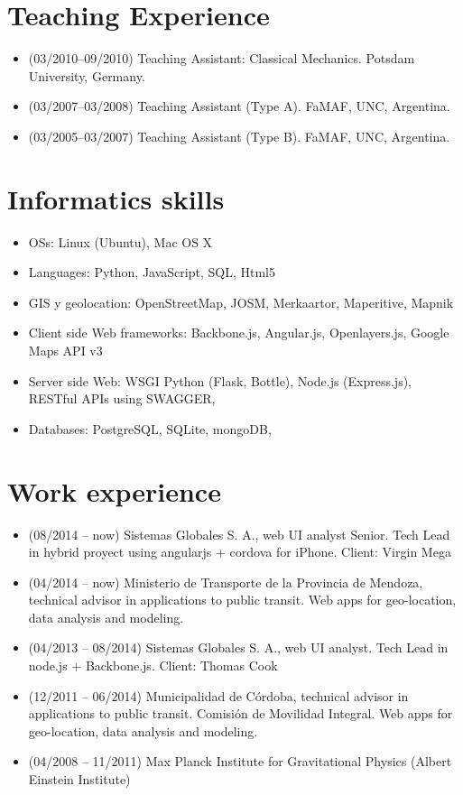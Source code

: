 \documentclass[a4paper]{article}
\begin{document}
\section{Teaching Experience}
\begin{itemize}
 \item(03/2010--09/2010) Teaching Assistant: Classical Mechanics. Potsdam
University, Germany.
 \item(03/2007--03/2008) Teaching Assistant (Type A). FaMAF, UNC, Argentina.
 \item(03/2005--03/2007) Teaching Assistant (Type B). FaMAF, UNC, Argentina.
\end{itemize}

\section{Informatics skills}
\begin{itemize}
 \item OSs: Linux (Ubuntu), Mac OS X
 \item Languages: Python, JavaScript, SQL, Html5
 \item GIS y geolocation: OpenStreetMap, JOSM, Merkaartor, Maperitive, Mapnik
 \item Client side Web frameworks: Backbone.js, Angular.js, Openlayers.js, Google Maps API 
v3
 \item Server side Web: WSGI Python (Flask, Bottle), Node.js (Express.js), 
RESTful APIs using SWAGGER,
 \item Databases: PostgreSQL, SQLite, mongoDB,
\end{itemize}

\section{Work experience}
\begin{itemize}
 \item (08/2014 -- now) Sistemas Globales S. A., web UI analyst Senior. 
Tech Lead in hybrid proyect using angularjs + cordova for iPhone. Client: Virgin Mega
 \item (04/2014 -- now) Ministerio de Transporte de la Provincia de Mendoza, 
 technical advisor in applications to public transit. Web apps for geo-location, data analysis and modeling.
 \item (04/2013 -- 08/2014) Sistemas Globales S. A., web UI analyst. 
Tech Lead in node.js + Backbone.js. Client: Thomas Cook
 \item (12/2011 -- 06/2014) Municipalidad de Córdoba, technical advisor in applications to public transit.
 Comisión de Movilidad Integral. Web apps for geo-location, data analysis and modeling.
 \item (04/2008 -- 11/2011) Max Planck Institute for Gravitational Physics
(Albert Einstein Institute)
\end{itemize}
\end{document}
